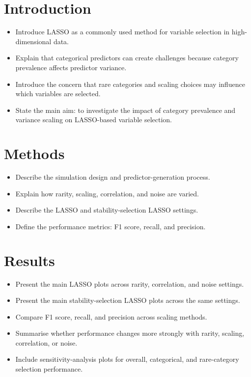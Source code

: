 \documentclass[12pt,a4paper,twoside]{report}
\begin{document}
\chapter{Introduction}

\begin{itemize}
  \item Introduce LASSO as a commonly used method for variable selection in high-dimensional data.
  \item Explain that categorical predictors can create challenges because category prevalence affects predictor variance.
  \item Introduce the concern that rare categories and scaling choices may influence which variables are selected.
  \item State the main aim: to investigate the impact of category prevalence and variance scaling on LASSO-based variable selection.
\end{itemize}

\chapter{Methods}

\begin{itemize}
  \item Describe the simulation design and predictor-generation process.
  \item Explain how rarity, scaling, correlation, and noise are varied.
  \item Describe the LASSO and stability-selection LASSO settings.
  \item Define the performance metrics: F1 score, recall, and precision.
\end{itemize}

\chapter{Results}

\begin{itemize}
  \item Present the main LASSO plots across rarity, correlation, and noise settings.
  \item Present the main stability-selection LASSO plots across the same settings.
  \item Compare F1 score, recall, and precision across scaling methods.
  \item Summarise whether performance changes more strongly with rarity, scaling, correlation, or noise.
  \item Include sensitivity-analysis plots for overall, categorical, and rare-category selection performance.
\end{itemize}
\end{document}
